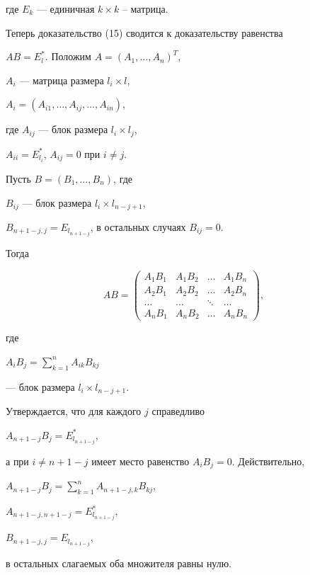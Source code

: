 где $E_{k}$ --- единичная $k\times k$ -- матрица.


Теперь доказательство (15) сводится к доказательству равенства


$AB=E_l^*$. Положим $A=(A_1, \dotsc, A_n)^{T}$,


$A_i$ --- матрица размера $l_i \times l$,\linebreak


$A_i=(A_{i1}, \dotsc, A_{ij}, \dotsc ,A_{in})$,


где $A_{ij}$ --- блок размера $l_i \times l_j$,


$A_{ii}=E_{l_i}^*$, $A_{ij}=0$ при $i\ne j$.


Пусть $B=(B_1, \dotsc ,B_n)$, где


$B_{ij}$ --- блок размера $l_i \times l_{n-j+1}$, 


$B_{n+1-j,j}=E_{l_{n+1-j}}$,  в остальных случаях $B_{ij}=0$.


Тогда


$$


AB=


\begin{pmatrix}


A_1B_1 & A_1B_2 & \dotsc & A_1B_n \\


A_2B_1 & A_2B_2 & \dotsc & A_2B_n \\


\dotsc & \dotsc & \ddots & \dotsc \\


A_nB_1 & A_nB_2 & \dotsc & A_nB_n 


\end{pmatrix},


$$


где


$A_iB_j=\sum\limits_{k=1}^{n} A_{ik}B_{kj}$


--- блок размера $l_i \times l_{n-j+1}$.


Утверждается, что для каждого $j$ справедливо


$A_{n+1-j}B_j=E_{l_{n+1-j}}^*$,


а при $i\ne n+1-j$ имеет место равенство $A_iB_j=0$. Действительно,


$A_{n+1-j}B_j=\sum\limits_{k=1}^n A_{n+1-j,k}B_{kj}$,


$A_{n+1-j,n+1-j}=E_{l_{n+1-j}}^*$,


$B_{n+1-j,j}=E_{l_{n+1-j}}$,


в остальных слагаемых оба множителя равны нулю.





